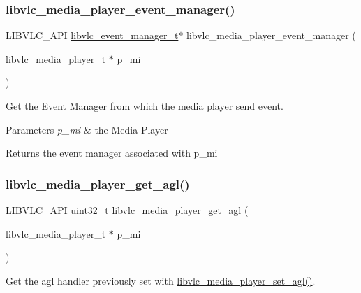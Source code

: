 \subsubsection{\texorpdfstring{libvlc\+\_\+media\+\_\+player\+\_\+event\+\_\+manager()}{libvlc\_media\_player\_event\_manager()}}
{\footnotesize\ttfamily L\+I\+B\+V\+L\+C\+\_\+\+A\+PI \hyperlink{group__libvlc__event_gaa82f247503d3558b9117550e8d3c9259}{libvlc\+\_\+event\+\_\+manager\+\_\+t}$\ast$ libvlc\+\_\+media\+\_\+player\+\_\+event\+\_\+manager (\begin{DoxyParamCaption}\item[{libvlc\+\_\+media\+\_\+player\+\_\+t $\ast$}]{p\+\_\+mi }\end{DoxyParamCaption})}

Get the Event Manager from which the media player send event.


\begin{DoxyParams}{Parameters}
{\em p\+\_\+mi} & the Media Player \\
\hline
\end{DoxyParams}
\begin{DoxyReturn}{Returns}
the event manager associated with p\+\_\+mi 
\end{DoxyReturn}
\mbox{\label{group__libvlc__media__player_ga143905045e1be83d8ae3764d1d589b24}} 
\subsubsection{\texorpdfstring{libvlc\+\_\+media\+\_\+player\+\_\+get\+\_\+agl()}{libvlc\_media\_player\_get\_agl()}}
{\footnotesize\ttfamily L\+I\+B\+V\+L\+C\+\_\+\+A\+PI uint32\+\_\+t libvlc\+\_\+media\+\_\+player\+\_\+get\+\_\+agl (\begin{DoxyParamCaption}\item[{libvlc\+\_\+media\+\_\+player\+\_\+t $\ast$}]{p\+\_\+mi }\end{DoxyParamCaption})}

Get the agl handler previously set with \hyperlink{group__libvlc__media__player_gadc35c9afb5789c16fbe8e1f358ec141b}{libvlc\+\_\+media\+\_\+player\+\_\+set\+\_\+agl()}.


